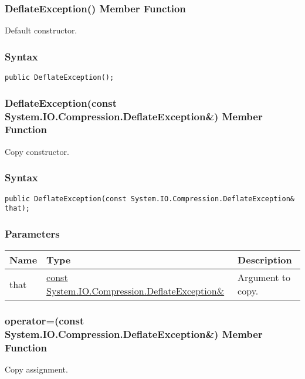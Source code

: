 \documentclass[a4paper,oneside,11.000000pt]{book}
\begin{document}
\hypertarget{System.IO.Compression.DeflateException.constructor.P.System.IO.Compression.DeflateException}{\subsubsection*{DeflateException() Member Function}}\begin{flushleft}
Default constructor.

\end{flushleft}
\subsubsection*{Syntax}
\texttt{public DeflateException();}
\clearpage

\hypertarget{System.IO.Compression.DeflateException.constructor.P.System.IO.Compression.DeflateException.C.R.System.IO.Compression.DeflateException}{\subsubsection*{DeflateException(const System.IO.Compression.DeflateException\&) Member Function}}\begin{flushleft}
Copy constructor.

\end{flushleft}
\subsubsection*{Syntax}
\texttt{public DeflateException(const System.IO.Compression.DeflateException\& that);}
\subsubsection*{Parameters}
\begin{flushleft}
\begin{supertabular}[l]{!{\raggedright}p{1.30721cm}!{\raggedright}p{8.55945cm}!{\raggedright}p{4.55908cm}}
\textbf{Name}
& \textbf{Type}
& \textbf{Description}
\\
\hline
that
& \hyperlink{System.IO.Compression.DeflateException}{const System.\-IO.\-Compression.\-DeflateException\&\-}
& Argument to copy.

\\
\end{supertabular}

\end{flushleft}
\clearpage

\hypertarget{System.IO.Compression.DeflateException.operator.assign.P.System.IO.Compression.DeflateException.C.R.System.IO.Compression.DeflateException}{\subsubsection*{operator=(const System.IO.Compression.DeflateException\&) Member Function}}\begin{flushleft}
Copy assignment.

\end{flushleft}
\end{document}
